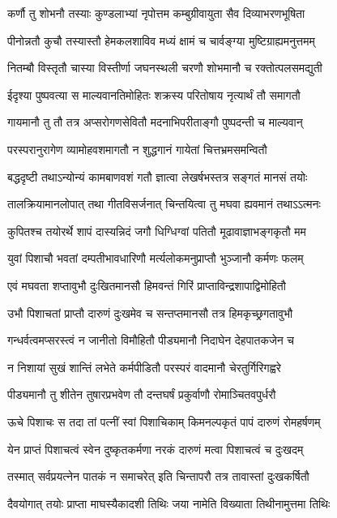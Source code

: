 \twolineshloka
{कर्णौ तु शोभनौ तस्याः कुण्डलाभ्यां नृपोत्तम}
{कम्बुग्रीवायुता सैव दिव्याभरणभूषिता}%

\twolineshloka
{पीनोन्नतौ कुचौ तस्यास्तौ हेमकलशाविव}
{मध्यं क्षामं च चार्वङ्ग्या मुष्टिग्राह्यमनुत्तमम्}%

\twolineshloka
{नितम्बौ विस्तृतौ चास्या विस्तीर्णा जघनस्थली}
{चरणौ शोभमानौ च रक्तोत्पलसमद्युती}%

\twolineshloka
{ईदृश्या पुष्पवत्या स माल्यवानतिमोहितः}
{शक्रस्य परितोषाय नृत्यार्थं तौ समागतौ}%

\twolineshloka
{गायमानौ तु तौ तत्र अप्सरोगणसेवितौ}
{मदनाभिपरीताङ्गौ पुष्पदन्ती च माल्यवान्}%

\twolineshloka
{परस्परानुरागेण व्यामोहवशमागतौ}
{न शुद्धगानं गायेतां चित्तभ्रमसमन्वितौ}%

\twolineshloka
{बद्धदृष्टी तथाऽन्योन्यं कामबाणवशं गतौ}
{ज्ञात्वा लेखर्षभस्तत्र सङ्गतं मानसं तयोः}%

\twolineshloka
{तालक्रियामानलोपात् तथा गीतविसर्जनात्}
{चिन्तयित्वा तु मघवा ह्यवमानं तथाऽऽत्मनः}%

\twolineshloka
{कुपितश्च तयोरर्थे शापं दास्यन्निदं जगौ}
{धिग्धिग्वां पतितौ मूढावाज्ञाभङ्गकृतौ मम}%

\twolineshloka
{युवां पिशाचौ भवतां दम्पतीभावधारिणौ}
{मर्त्यलोकमनुप्राप्तौ भुञ्जानौ कर्मणः फलम्}%

\twolineshloka
{एवं मघवता शप्तावुभौ दुःखितमानसौ}
{हिमवन्तं गिरिं प्राप्ताविन्द्रशापाद्विमोहितौ}%

\twolineshloka
{उभौ पिशाचतां प्राप्तौ दारुणं दुःखमेव च}
{सन्तप्तमानसौ तत्र हिमकृच्छ्रगतावुभौ}%

\twolineshloka
{गन्धर्वत्वमप्सरस्त्वं न जानीतो विमौहितौ}
{पीड्यमानौ निदाघेन देहपातकजेन च}%

\twolineshloka
{न निशायां सुखं शान्तिं लभेते कर्मपीडितौ}
{परस्परं वादमानौ चेरतुर्गिरिगह्वरे}%

\twolineshloka
{पीड्यमानौ तु शीतेन तुषारप्रभवेण तौ}
{दन्तघर्षं प्रकुर्वाणौ रोमाञ्चितवपुर्धरौ}%

\twolineshloka
{ऊचे पिशाचः स तदा तां पत्नीं स्वां पिशाचिकाम्}
{किमनल्पकृतं पापं दारुणं रोमहर्षणम्}%

\twolineshloka
{येन प्राप्तं पिशाचत्वं स्वेन दुष्कृतकर्मणा}
{नरकं दारुणं मत्वा पिशाचत्वं च दुःखदम्}%

\twolineshloka
{तस्मात् सर्वप्रयत्नेन पातकं न समाचरेत्}
{इति चिन्तापरौ तत्र तावास्तां दुःखकर्षितौ}%

\twolineshloka
{दैवयोगात् तयोः प्राप्ता माघस्यैकादशी तिथिः}
{जया नामेति विख्याता तिथीनामुत्तमा तिथिः}%

